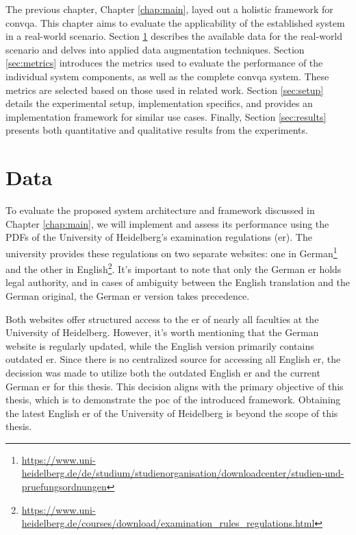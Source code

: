 The previous chapter, Chapter \ref{chap:main}, layed out a holistic framework for \gls{convqa}. This chapter aims to evaluate the applicability of the established system in a real-world scenario. Section \ref{sec:data} describes the available data for the real-world scenario and delves into applied data augmentation techniques. Section \ref{sec:metrics} introduces the metrics used to evaluate the performance of the individual system components, as well as the complete \gls{convqa} system. These metrics are selected based on those used in related work. Section \ref{sec:setup} details the experimental setup, implementation specifics, and provides an implementation framework for similar use cases. Finally, Section \ref{sec:results} presents both quantitative and qualitative results from the experiments.

\section{Data}
\label{sec:data}

To evaluate the proposed system architecture and framework discussed in Chapter \ref{chap:main}, we will implement and assess its performance using the PDFs of the University of Heidelberg's examination regulations (\gls{er}). The university provides these regulations on two separate websites: one in German\footnote{\url{https://www.uni-heidelberg.de/de/studium/studienorganisation/downloadcenter/studien-und-pruefungsordnungen}} and the other in English\footnote{\url{https://www.uni-heidelberg.de/courses/download/examination_rules_regulations.html}}. It's important to note that only the German \gls{er} holds legal authority, and in cases of ambiguity between the English translation and the German original, the German \gls{er} version takes precedence.

Both websites offer structured access to the \gls{er} of nearly all faculties at the University of Heidelberg. However, it's worth mentioning that the German website is regularly updated, while the English version primarily contains outdated \gls{er}. Since there is no centralized source for accessing all English \gls{er}, the decission was made to utilize both the outdated English \gls{er} and the current German \gls{er} for this thesis. This decision aligns with the primary objective of this thesis, which is to demonstrate the \gls{poc} of the introduced framework. Obtaining the latest English \gls{er} of the University of Heidelberg is beyond the scope of this thesis.


